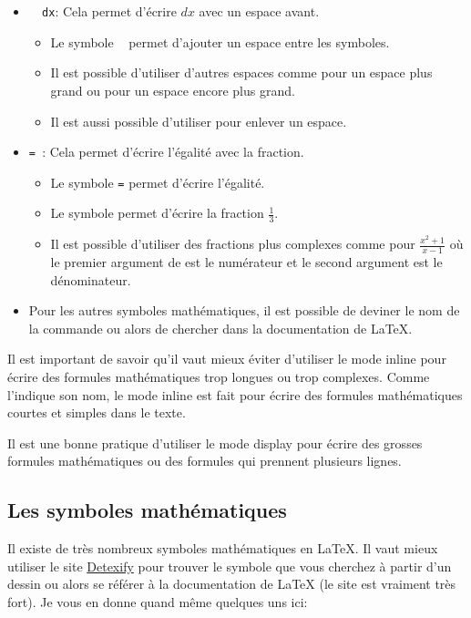 \begin{itemize}
\begin{itemize}
        \item \texttt{\, dx}: Cela permet d'écrire \(dx\) avec un espace avant.
        \begin{itemize}
            \item Le symbole \texttt{\,} permet d'ajouter un espace entre les symboles.
            \item Il est possible d'utiliser d'autres espaces comme \texttt{\quad} pour un espace plus grand ou \texttt{\qquad} pour un espace encore plus grand.
            \item Il est aussi possible d'utiliser \texttt{\!} pour enlever un espace.
        \end{itemize}

        \item \texttt{= }: Cela permet d'écrire l'égalité avec la fraction.
        \begin{itemize}
            \item Le symbole \texttt{=} permet d'écrire l'égalité.
            \item Le symbole \texttt{} permet d'écrire la fraction \(\frac{1}{3}\).
            \item Il est possible d'utiliser des fractions plus complexes comme \texttt{} pour \(\frac{x^2 + 1}{x - 1}\)
            où le premier argument de \texttt{\frac{}{}} est le numérateur et le second argument est le dénominateur.
        \end{itemize}

        \item Pour les autres symboles mathématiques, il est possible de deviner le nom de la commande
        ou alors de chercher dans la documentation de LaTeX.
    \end{itemize}
\end{itemize}

Il est important de savoir qu'il vaut mieux éviter d'utiliser le mode inline
pour écrire des formules mathématiques trop longues ou trop complexes. Comme l'indique son nom,
le mode inline est fait pour écrire des formules mathématiques courtes et simples dans le texte.

Il est une bonne pratique d'utiliser le mode display pour écrire des grosses formules
mathématiques ou des formules qui prennent plusieurs lignes.

\subsection{Les symboles mathématiques}\label{subsec:latex_math_symbols}
Il existe de très nombreux symboles mathématiques en LaTeX.
Il vaut mieux utiliser le site \href{detexify.kirelabs.org}{Detexify} pour
trouver le symbole que vous cherchez à partir d'un dessin ou alors se référer à la
documentation de LaTeX (le site est vraiment très fort). Je vous en donne quand même quelques uns ici:

